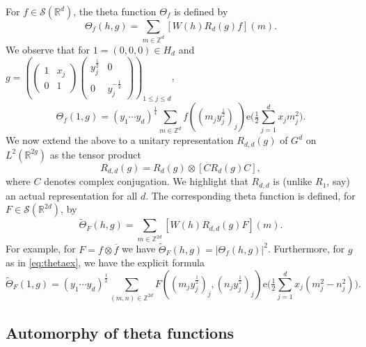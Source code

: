\documentclass[12pt]{amsart}
\theoremstyle{definition}
\theoremstyle{remark}
\numberwithin{equation}{section}
\newcommand{\R}{\mathbb{R}}
\newcommand{\Z}{\mathbb{Z}}
\newcommand{\e}{\mathrm{e}}
\newcommand{\cS}{\mathcal{S}}
\begin{document}
For $f\in\cS(\R^d)$, the theta function $\Theta_f$ is defined by
\begin{equation}
  \label{eq:thetadef}
  \Theta_f(h, g) = \sum_{m \in \Z^d} [W(h)R_d(g)f](m).
\end{equation}
We observe that for $1 =(0,0,0) \in H_d$ and $g = \left(
\begin{pmatrix}
  1 & x_j \\
  0 & 1
\end{pmatrix}
\begin{pmatrix}
  y_j^{\frac{1}{2}} & 0 \\
  0 & y_j^{-\frac{1}{2}}
\end{pmatrix}
\right)_{\!\!1\leq j\leq d}$,
\begin{equation}
  \label{eq:thetaex}
  \Theta_f(1, g)
  = (y_1 \cdots y_d)^{\frac{1}{4}}\sum_{m \in \Z^d} f\left(( m_j y_j^{\frac{1}{2}})_j\right) \e\bigg( \tfrac{1}{2} \sum_{j=1}^d x_jm_j^2 \bigg).
\end{equation}
We now extend the above to a unitary representation $R_{d,d}(g)$ of $G^d$ on $L^2(\R^{2g})$
as the tensor product
\begin{equation}
R_{d,d}(g) = R_d(g) \otimes [C R_d(g) C], 
\end{equation}
where $C$ denotes complex conjugation. We highlight that $R_{d,d}$ is (unlike $R_1$, say) an actual representation for all $d$. The corresponding theta function is defined, for $F\in\cS(\R^{2d})$, by
\begin{equation}
  \label{eq:thetadefdd}
  \widetilde\Theta_F(h, g) = \sum_{m \in \Z^{2d}} [W(h)R_{d,d}(g)F](m).
\end{equation}
For example, for $F=f\otimes \overline f$ we have
$\widetilde\Theta_F(h, g) = |\Theta_f(h, g)|^2$.
Furthermore, for $g$ as in \eqref{eq:thetaex}, we have the explicit formula 
\begin{equation}
  \label{eq:thetaexdd}
  \widetilde\Theta_F(1, g)
  = (y_1 \cdots y_d)^{\frac{1}{2}}\sum_{(m,n) \in \Z^{2d}} F\left(( m_j y_j^{\frac{1}{2}})_j,( n_j y_j^{\frac{1}{2}})_j\right) \e\bigg( \tfrac{1}{2} \sum_{j=1}^d x_j(m_j^2-n_j^2) \bigg).
\end{equation}


\subsection{Automorphy of theta functions}
\label{sec:automorphy}
\end{document}
